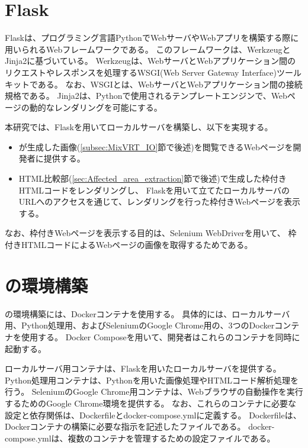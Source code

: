 \section{Flask}\label{sec:Flask}
Flask\cite{Flask}は、プログラミング言語PythonでWebサーバやWebアプリを構築する際に用いられるWebフレームワークである。
このフレームワークは、Werkzeug\cite{Werkzeug}とJinja2\cite{Jinja}に基づいている。
Werkzeugは、WebサーバとWebアプリケーション間のリクエストやレスポンスを処理するWSGI(Web Server Gateway Interface)ツールキットである。
なお、WSGI\cite{WSGI}とは、WebサーバとWebアプリケーション間の接続規格である。
Jinja2は、Pythonで使用されるテンプレートエンジン\cite{TemplateEngine}で、Webページの動的なレンダリングを可能にする。
\par
本研究では、Flaskを用いてローカルサーバを構築し、以下を実現する。
\begin{itemize}
      \setlength{\itemsep}{0pt}
            \setlength{\parsep}{0pt}
      \item \toolName が生成した画像(\ref{subsec:MixVRT_IO}節で後述)を閲覧できるWebページを開発者に提供する。
      \item HTML比較部(\ref{sec:Affected_area_extraction}節で後述)で生成した枠付きHTMLコードをレンダリングし、
            Flaskを用いて立てたローカルサーバのURLへのアクセスを通じて、レンダリングを行った枠付きWebページを表示する。
\end{itemize}
なお、枠付きWebページを表示する目的は、Selenium WebDriverを用いて、
枠付きHTMLコードによるWebページの画像を取得するためである。

\section{\toolName の環境構築}\label{sec:MixVRT_env_gen}
\toolName の環境構築には、Dockerコンテナ\cite{DockerContainer}を使用する。
具体的には、ローカルサーバ用、Python処理用、およびSeleniumのGoogle Chrome用の、3つのDockerコンテナを使用する。
Docker Compose\cite{DockerCompose}を用いて、開発者はこれらのコンテナを同時に起動する。
\par
ローカルサーバ用コンテナは、Flaskを用いたローカルサーバを提供する。
Python処理用コンテナは、Pythonを用いた画像処理やHTMLコード解析処理を行う。
SeleniumのGoogle Chrome用コンテナは、Webブラウザの自動操作を実行するためのGoogle Chrome環境を提供する。
なお、これらのコンテナに必要な設定と依存関係は、Dockerfileとdocker-compose.ymlに定義する。
Dockerfileは、Dockerコンテナの構築に必要な指示を記述したファイルである。
docker-compose.ymlは、複数のコンテナを管理するための設定ファイルである。

